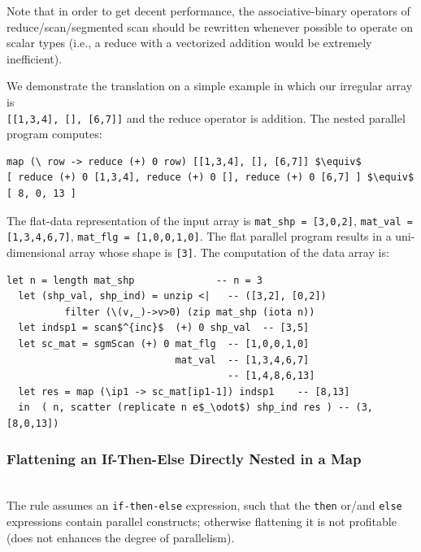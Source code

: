 \documentclass[acmsmall,review]{acmart}\settopmatter{printfolios=true,printccs=false,printacmref=false}
\begin{document}
Note that in order to get decent performance, the associative-binary 
operators of reduce/scan/segmented scan should be rewritten whenever 
possible to operate on scalar types (i.e., a reduce with a vectorized 
addition would be extremely inefficient).

We demonstrate the translation on a simple example in which our
irregular array is\\  {\tt[[1,3,4], [], [6,7]]} and the reduce operator
is addition. The nested parallel program computes:
\begin{lstlisting}[mathescape=true]
map (\ row -> reduce (+) 0 row) [[1,3,4], [], [6,7]] $\equiv$
[ reduce (+) 0 [1,3,4], reduce (+) 0 [], reduce (+) 0 [6,7] ] $\equiv$
[ 8, 0, 13 ]
\end{lstlisting}\vspace{-2ex}

The flat-data representation of the input array is {\tt mat\_shp = [3,0,2]},
{\tt mat\_val = [1,3,4,6,7]}, {\tt mat\_flg = [1,0,0,1,0]}.
The flat parallel program results in a uni-dimensional array whose shape 
is {\tt[3]}.
The computation of the data array is:
\begin{lstlisting}[mathescape=true]
  let n = length mat_shp              -- n = 3
  let (shp_val, shp_ind) = unzip <|   -- ([3,2], [0,2])
          filter (\(v,_)->v>0) (zip mat_shp (iota n))
  let indsp1 = scan$^{inc}$  (+) 0 shp_val  -- [3,5]
  let sc_mat = sgmScan (+) 0 mat_flg  -- [1,0,0,1,0] 
                             mat_val  -- [1,3,4,6,7]
                                      -- [1,4,8,6,13]    
  let res = map (\ip1 -> sc_mat[ip1-1]) indsp1    -- [8,13]
  in  ( n, scatter (replicate n e$_\odot$) shp_ind res ) -- (3, [8,0,13])
\end{lstlisting}


\subsubsection{Flattening an If-Then-Else Directly Nested in a Map}
\label{subsubsec:if-in-map}
$\mbox{ }$\\

The rule assumes an \lstinline{if-then-else} expression, such that the 
\lstinline{then} or/and \lstinline{else} expressions contain parallel 
constructs; otherwise flattening it is not profitable (does not
enhances the degree of parallelism).
\end{document}
